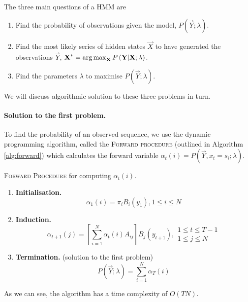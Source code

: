 \paragraph{}
	The three main questions of a HMM are
	\begin{enumerate}
		\item Find the probability of observations given the model, $P\left(\vec Y; \lambda\right)$.
		\item Find the most likely series of hidden states $\vec X$ to have generated the observations $\vec Y$, $\boldsymbol{\mathbf{X}}^\ast = \operatorname*{arg\,max}_{\boldsymbol{\mathbf{X}}} P\left(\boldsymbol{\mathbf{Y}} | \boldsymbol{\mathbf{X}}; \lambda\right)$.
		\item Find the parameters $\lambda$ to maximise $P\left(\vec Y; \lambda\right)$.
	\end{enumerate}
We will discuss algorithmic solution to these three problems in turn.

\paragraph{Solution to the first problem.} To find the probability of an observed sequence, we use the dynamic programming algorithm, called the \textsc{Forward procedure} (outlined in Algorithm \ref{alg:forward}) which calculates the forward variable $\alpha_t (i) = P(\vec Y, x_t = s_i; \lambda)$.
\begin{algorithm}
	\caption{\textsc{Forward Procedure} for computing $\alpha_t(i)$.}
	\label{alg:forward}
	\begin{enumerate}
		\item
			\textbf{Initialisation.}
			$$\alpha_1(i) = \pi_i B_i(y_1), 1 \leq i \leq N$$
		\item
			\textbf{Induction.}
			\begin{equation*}
				\alpha_{t + 1}(j) = \left[ \sum_{i = 1}^N \alpha_t(i) A_{ij} \right] B_j (y_{t + 1}), 
				\begin{array}{lr}
					1 \leq t \leq T - 1\\
					1 \leq j \leq N
				\end{array}
			\end{equation*}
			
		\item
			\textbf{Termination.} (solution to the first problem)
			$$P\left(\vec Y; \lambda\right) = \sum_{i = 1}^N \alpha_T(i)$$
	\end{enumerate}
\end{algorithm}
As we can see, the algorithm has a time complexity of $O(TN)$.

